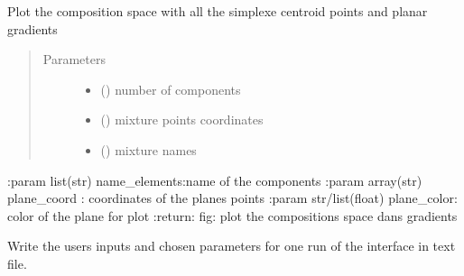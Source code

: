 \documentclass[letterpaper,10pt,english]{sphinxmanual}
\begin{document}
\begin{fulllineitems}
\label{\detokenize{ExperimentsPlannification:modules.plot_compo_space_planes}}
\sphinxAtStartPar
Plot the composition space with all the simplexe centroid points and planar gradients
\begin{quote}\begin{description}
\item[{Parameters}] \leavevmode\begin{itemize}
\item {} 
\sphinxAtStartPar
{} () \textendash{} number of components

\item {} 
\sphinxAtStartPar
{} () \textendash{} mixture points coordinates

\item {} 
\sphinxAtStartPar
{} () \textendash{} mixture names

\end{itemize}

\end{description}\end{quote}

\sphinxAtStartPar
:param list(str) name\_elements:name of the components
:param array(str) plane\_coord : coordinates of the planes points
:param str/list(float) plane\_color: color of the plane for plot
:return: fig: plot the compositions space dans gradients

\end{fulllineitems}

\label{\detokenize{ExperimentsPlannification:module-modules}}

\begin{fulllineitems}
\label{\detokenize{ExperimentsPlannification:modules.parameters_file}}
\sphinxAtStartPar
Write the users inputs and chosen parameters for one run of the interface in text file.

\end{fulllineitems}
\end{document}
